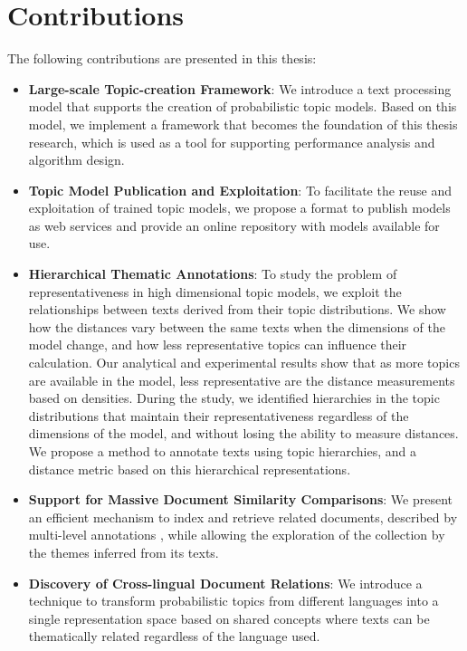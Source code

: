 \section{Contributions}

The following contributions are presented in this thesis:

\begin{itemize}
\item \textbf{Large-scale Topic-creation Framework}: We introduce a text processing model that supports the creation of probabilistic topic models. Based on this model, we implement a framework that becomes the foundation of this thesis research, which is used as a tool for supporting performance analysis and algorithm design.
\item \textbf{Topic Model Publication and Exploitation}: To facilitate the reuse and exploitation of trained topic models, we propose a format to publish models as web services and provide an online repository with models available for use.
\item \textbf{Hierarchical Thematic Annotations}: To study the problem of representativeness in high dimensional topic models, we exploit the relationships between texts derived from their topic distributions. We show how the distances vary between the same texts when the dimensions of the model change, and how less representative topics can influence their calculation. Our analytical and experimental results show that as more topics are available in the model, less representative are the distance measurements based on densities. During the study, we identified hierarchies in the topic distributions that maintain their representativeness regardless of the dimensions of the model, and without losing the ability to measure distances. We propose a method to annotate texts using topic hierarchies, and a distance metric based on this hierarchical representations.
\item \textbf{Support for Massive Document Similarity Comparisons}: We present an efficient mechanism to index and retrieve related documents, described by multi-level annotations , while allowing the exploration of the collection by the themes inferred from its texts.
\item \textbf{Discovery of Cross-lingual Document Relations}: We introduce a technique to transform probabilistic topics from different languages into a single representation space based on shared concepts where texts can be thematically related regardless of the language used.
\end{itemize}

